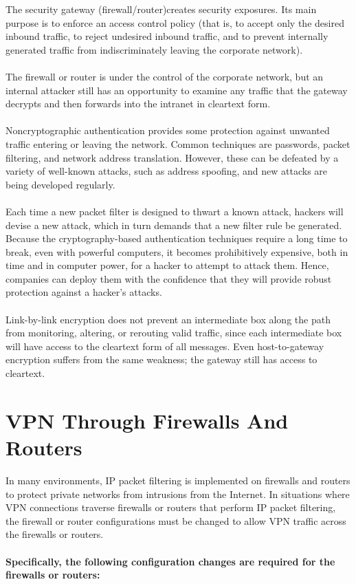 \documentclass[10pt,a4paper]{article}
\begin{document}
The security gateway (firewall/router)creates security
exposures. Its main purpose is to enforce an access control policy (that is, to
accept only the desired inbound traffic, to reject undesired inbound traffic, and to prevent internally generated traffic from indiscriminately leaving the corporate
network). 
\\
\\
The firewall or router is under the control of the corporate network, but
an internal attacker still has an opportunity to examine any traffic that the
gateway decrypts and then forwards into the intranet in cleartext form.
\\
\\
Noncryptographic authentication provides some protection against unwanted
traffic entering or leaving the network. Common techniques are passwords,
packet filtering, and network address translation. However, these can be
defeated by a variety of well-known attacks, such as address spoofing, and new
attacks are being developed regularly. 
\\
\\
Each time a new packet filter is designed
to thwart a known attack, hackers will devise a new attack, which in turn demands
that a new filter rule be generated.
Because the cryptography-based authentication techniques require a long time to
break, even with powerful computers, it becomes prohibitively expensive, both in
time and in computer power, for a hacker to attempt to attack them. Hence,
companies can deploy them with the confidence that they will provide robust
protection against a hacker's attacks.
\\
\\
Link-by-link encryption does not prevent an intermediate box along the path from
monitoring, altering, or rerouting valid traffic, since each intermediate box will
have access to the cleartext form of all messages. Even host-to-gateway
encryption suffers from the same weakness; the gateway still has access to
cleartext.

\section{VPN Through Firewalls And Routers}

In many environments, IP packet filtering is implemented on firewalls and routers
to protect private networks from intrusions from the Internet. In situations where
VPN connections traverse firewalls or routers that perform IP packet filtering, the firewall or router configurations must be changed to allow VPN
traffic across the firewalls or routers.
\\
\\
\textbf{Specifically, the following configuration changes are required for the firewalls or
routers:}
\end{document}
